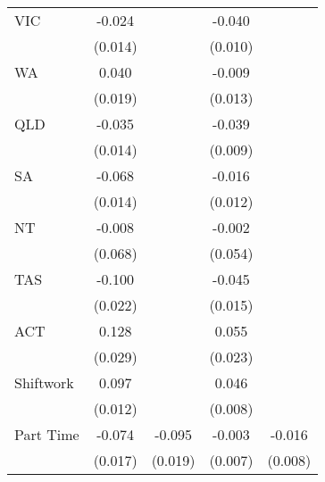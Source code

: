 {\begin{tabular}{l*{4}{c}}
VIC                 &      -0.024\sym{*}  &                     &      -0.040\sym{***}&                     \\
                    &     (0.014)         &                     &     (0.010)         &                     \\
WA                  &       0.040\sym{**} &                     &      -0.009         &                     \\
                    &     (0.019)         &                     &     (0.013)         &                     \\
QLD                 &      -0.035\sym{**} &                     &      -0.039\sym{***}&                     \\
                    &     (0.014)         &                     &     (0.009)         &                     \\
SA                  &      -0.068\sym{***}&                     &      -0.016         &                     \\
                    &     (0.014)         &                     &     (0.012)         &                     \\
NT                  &      -0.008         &                     &      -0.002         &                     \\
                    &     (0.068)         &                     &     (0.054)         &                     \\
TAS                 &      -0.100\sym{***}&                     &      -0.045\sym{***}&                     \\
                    &     (0.022)         &                     &     (0.015)         &                     \\
ACT                 &       0.128\sym{***}&                     &       0.055\sym{**} &                     \\
                    &     (0.029)         &                     &     (0.023)         &                     \\
Shiftwork           &       0.097\sym{***}&                     &       0.046\sym{***}&                     \\
                    &     (0.012)         &                     &     (0.008)         &                     \\
Part Time           &      -0.074\sym{***}&      -0.095\sym{***}&      -0.003         &      -0.016\sym{**} \\
                    &     (0.017)         &     (0.019)         &     (0.007)         &     (0.008)         \\

\end{tabular}}
